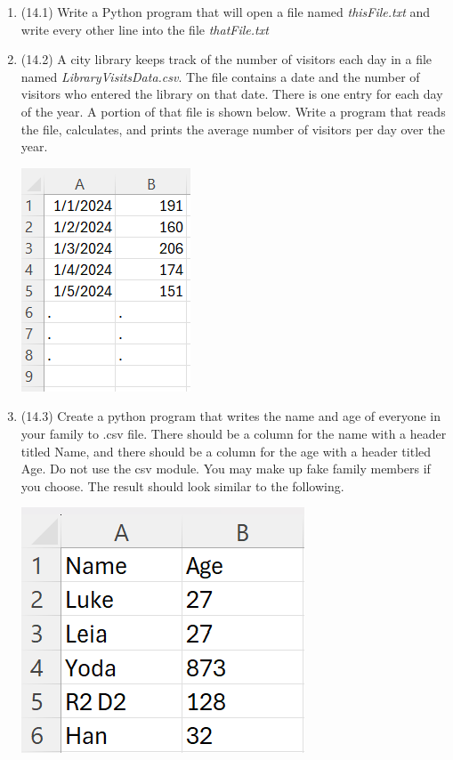 \documentclass{article}
\begin{document}
\begin{enumerate}
\item (14.1) 
		Write a Python program that will open a file named \textit{thisFile.txt} and write every 
		other line into the file
		\textit{thatFile.txt}

\item (14.2) 
		A city library keeps track of the number of visitors each day in a file named 
		\textit{LibraryVisitsData.csv}.  
		The file contains a date and the number of visitors who entered the library on that date.  
		There is one entry for each day of the year. A portion of that file is shown below.  
		Write a program that reads the file, calculates, and prints the average number of visitors 
		per day over the year.
		
		\begin{flushright}
			\includegraphics[scale=.65]{imgs/LibraryVisitsData.PNG}
		\end{flushright}


\item (14.3) 
		Create a python program that writes the name and age of everyone in your family to .csv file.
		There should be a column for the name with a header titled Name, and there should be a column 
		for the age with a header titled Age.
		Do not use the csv module. You may make up fake family members if you choose. The result
		should look similar to the following.
		
		\begin{flushright}
			\includegraphics[scale=.65]{imgs/WritingFamily.PNG}
		\end{flushright}







\end{enumerate}
\pagebreak
\end{document}
